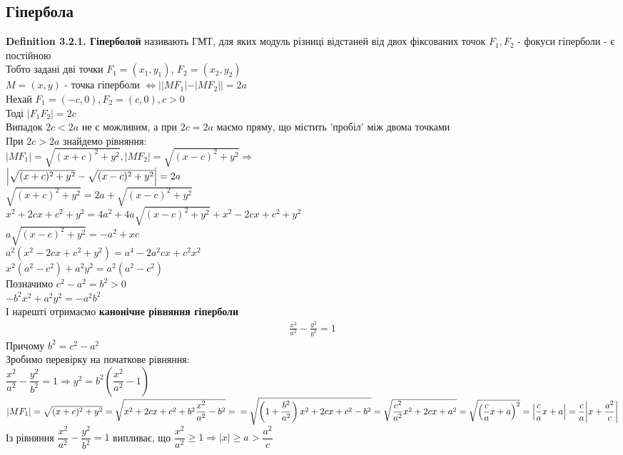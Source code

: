 \documentclass[a4paper, 14pt]{extarticle}
\def\defin#1{\textbf{Definition {#1}}}
\def\bigline{\vspace{5mm}\\}
\begin{document}
\subsection{Гіпербола}
\defin{3.2.1. Гіперболой} називають ГМТ, для яких модуль різниці відстаней від двох фіксованих точок $F_1,F_2$ - фокуси гіперболи - є постійною
\bigline
Тобто задані дві точки $F_1 = (x_1,y_1)$, $F_2 = (x_2,y_2)$\\
$M = (x,y)$ - точка гіперболи $\iff ||MF_1|-|MF_2|| = 2a$
\bigline
Нехай $F_1 = (-c,0), F_2 = (c,0), c>0$\\
Тоді $|F_1F_2| = 2c$\\
Випадок $2c<2a$ не є можливим, а при $2c = 2a$ маємо пряму, що містить 'пробіл' між двома точками\\
При $2c>2a$ знайдемо рівняння:\\
$|MF_1|=\sqrt{(x+c)^2+y^2}, |MF_2|=\sqrt{(x-c)^2+y^2} \Rightarrow$\\
$\abs{\sqrt{(x+c)^2+y^2}-\sqrt{(x-c)^2+y^2}}=2a$\\
$\sqrt{(x+c)^2+y^2} = 2a + \sqrt{(x-c)^2+y^2}$\\
$x^2+2cx+c^2+y^2=4a^2+4a\sqrt{(x-c)^2+y^2}+x^2-2cx+c^2+y^2$\\
$a\sqrt{(x-c)^2+y^2}=-a^2+xc$\\
$a^2(x^2-2cx+c^2+y^2)=a^4-2a^2cx+c^2x^2$\\
$x^2(a^2-c^2)+a^2y^2=a^2(a^2-c^2)$\\
Позначимо $c^2-a^2=b^2>0$\\
$-b^2x^2+a^2y^2=-a^2b^2$\\
І нарешті отримаємо \textbf{канонічне рівняння гіперболи}
\begin{align*}
\frac{x^2}{a^2} - \frac{y^2}{b^2} = 1
\end{align*}
Причому $b^2 = c^2 - a^2$
\bigline
Зробимо перевірку на початкове рівняння:\\
$\dfrac{x^2}{a^2} - \dfrac{y^2}{b^2} = 1 \Rightarrow y^2 = b^2 \left(\dfrac{x^2}{a^2} -1 \right)$\\
$|MF_1| = \sqrt{(x+c)^2+y^2} = \sqrt{x^2+2cx+c^2+b^2\dfrac{x^2}{a^2} - b^2} = \\
= \sqrt{\left(1 + \dfrac{b^2}{a^2} \right)x^2 + 2cx + c^2 - b^2} = \sqrt{\dfrac{c^2}{a^2}x^2 + 2cx + a^2} = \sqrt{\left(\dfrac{c}{a}x + a \right)^2} = \abs{\dfrac{c}{a}x + a} = \dfrac{c}{a} \abs{x + \dfrac{a^2}{c}}$\\
Із рівняння $\dfrac{x^2}{a^2} - \dfrac{y^2}{b^2} = 1$ випливає, що $\dfrac{x^2}{a^2} \geq 1 \Rightarrow |x| \geq a > \dfrac{a^2}{c}$\\
\end{document}
